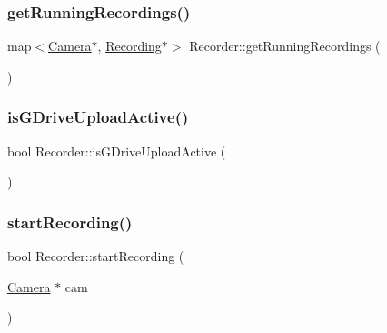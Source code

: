 \mbox{\label{class_recorder_afb29e7ee1c1d78b3b2c9e54133f88b62}} 
\subsubsection{\texorpdfstring{get\+Running\+Recordings()}{getRunningRecordings()}}
{\footnotesize\ttfamily map$<$\hyperlink{struct_camera}{Camera}$\ast$, \hyperlink{class_recording}{Recording}$\ast$$>$ Recorder\+::get\+Running\+Recordings (\begin{DoxyParamCaption}{ }\end{DoxyParamCaption})\hspace{0.3cm}{\ttfamily [inline]}}

\mbox{\label{class_recorder_a2c3f20dfa022c936ede65ca34becb890}} 
\subsubsection{\texorpdfstring{is\+G\+Drive\+Upload\+Active()}{isGDriveUploadActive()}}
{\footnotesize\ttfamily bool Recorder\+::is\+G\+Drive\+Upload\+Active (\begin{DoxyParamCaption}{ }\end{DoxyParamCaption})\hspace{0.3cm}{\ttfamily [inline]}}

\mbox{\label{class_recorder_ac242ca5967dbf81f9ea39464eee2b06a}} 
\subsubsection{\texorpdfstring{start\+Recording()}{startRecording()}}
{\footnotesize\ttfamily bool Recorder\+::start\+Recording (\begin{DoxyParamCaption}\item[{\hyperlink{struct_camera}{Camera} $\ast$}]{cam }\end{DoxyParamCaption})}

